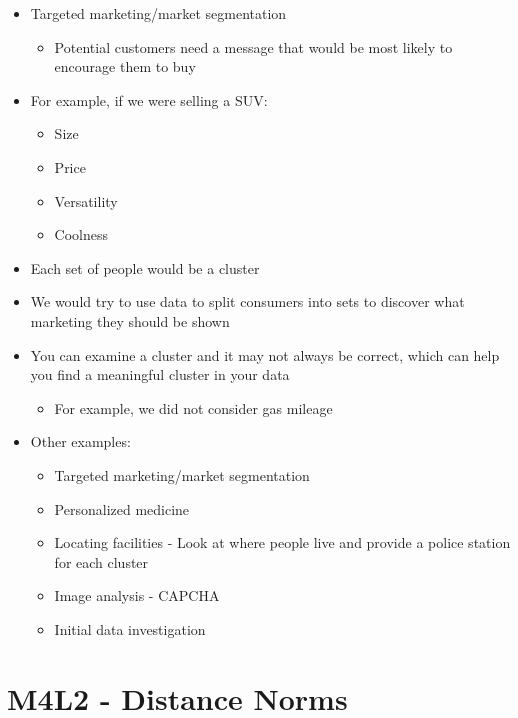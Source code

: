 \documentclass[
]{book}
\providecommand{\tightlist}{%
  \setlength{\itemsep}{0pt}\setlength{\parskip}{0pt}}
\begin{document}
\begin{itemize}
\tightlist
\item
  Targeted marketing/market segmentation

  \begin{itemize}
  \tightlist
  \item
    Potential customers need a message that would be most likely to encourage them to buy
  \end{itemize}
\item
  For example, if we were selling a SUV:

  \begin{itemize}
  \tightlist
  \item
    Size
  \item
    Price
  \item
    Versatility
  \item
    Coolness
  \end{itemize}
\item
  Each set of people would be a cluster
\item
  We would try to use data to split consumers into sets to discover what marketing they should be shown
\item
  You can examine a cluster and it may not always be correct, which can help you find a meaningful cluster in your data

  \begin{itemize}
  \tightlist
  \item
    For example, we did not consider gas mileage
  \end{itemize}
\item
  Other examples:

  \begin{itemize}
  \tightlist
  \item
    Targeted marketing/market segmentation
  \item
    Personalized medicine
  \item
    Locating facilities - Look at where people live and provide a police station for each cluster
  \item
    Image analysis - CAPCHA
  \item
    Initial data investigation
  \end{itemize}
\end{itemize}

\section{M4L2 - Distance Norms}\label{m4l2---distance-norms}
\end{document}
